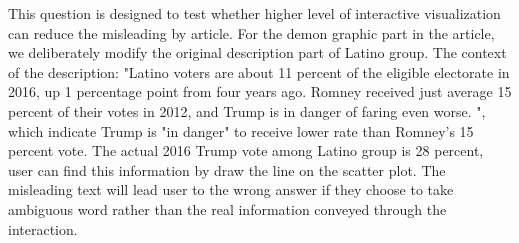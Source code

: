 \documentclass[9pt,journal,compsoc]{IEEEtran}
\begin{document}
This question is designed to test whether higher level of interactive visualization can reduce the misleading by article. For the demon graphic part in the article, we deliberately modify the original description part of Latino group. The context of the description: "Latino voters are about 11 percent of the eligible electorate in 2016, up 1 percentage point from four years ago. Romney received just average 15 percent of their votes in 2012, and Trump is in danger of faring even worse. ",  which indicate Trump is "in danger" to receive lower rate than Romney's 15 percent vote. The actual 2016 Trump vote among Latino group is 28 percent, user can find this information by draw the line on the scatter plot. The misleading text will lead user to the wrong answer if they choose to take ambiguous word rather than the real information conveyed through the interaction.  
\end{document}
